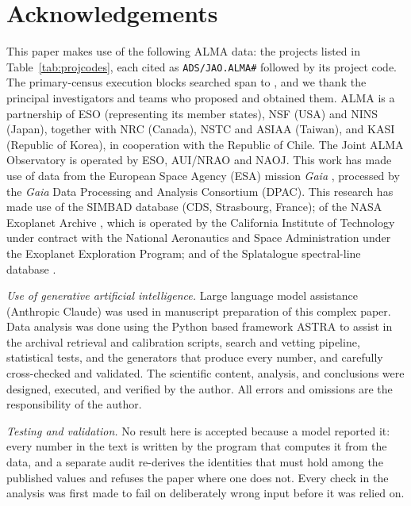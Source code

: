 \section*{Acknowledgements}
This paper makes use of the following ALMA data: the \NProjCodes{} projects
listed in Table~\ref{tab:projcodes}, each cited as \texttt{ADS/JAO.ALMA\#}
followed by its project code. The \NEB{} primary-census execution blocks
searched span \PrEbDateFirst{} to \PrEbDateLast{}, and we thank the principal
investigators and teams who proposed and obtained
them.\ProjCodeUnresClause{} ALMA is a partnership of ESO
(representing its member states), NSF (USA) and NINS (Japan), together with NRC
(Canada), NSTC and ASIAA (Taiwan), and KASI (Republic of Korea), in cooperation
with the Republic of Chile. The Joint ALMA Observatory is operated by ESO,
AUI/NRAO and NAOJ. This work has made use of data from the European Space
Agency (ESA) mission {\it Gaia} \citep{GaiaDR3}, processed by the {\it Gaia}
Data Processing and Analysis Consortium (DPAC). This research has made use
of the SIMBAD database \citep{SIMBAD2000} (CDS, Strasbourg, France); of the
NASA Exoplanet Archive \citep{NEA2013}, which is operated by the California
Institute of Technology under contract with the National Aeronautics and
Space Administration under the Exoplanet Exploration Program; and of the
Splatalogue spectral-line database \citep{Splatalogue2007}.

\emph{Use of generative artificial intelligence.} Large language model
assistance (Anthropic Claude) was used in manuscript preparation of this
complex paper. Data analysis was done using the Python based framework ASTRA
\citep[][\href{https://arxiv.org/abs/2610.36144}{https://\allowbreak arxiv.org/\allowbreak abs/}]{White2026ASTRA}
to assist in the archival retrieval and calibration scripts, search and
vetting pipeline, statistical tests, and the generators that produce every
number, and carefully cross-checked and validated. The scientific content,
analysis, and conclusions were designed, executed, and verified by the
author. All errors and omissions are the responsibility of the author.

\emph{Testing and validation.} No result here is accepted because a model
reported it: every number in the text is written by the program that computes it from the
data, and a separate audit re-derives the identities that must hold among the
published values and refuses the paper where one does not. Every check in the
analysis was first made to fail on deliberately wrong input before it was
relied on.

